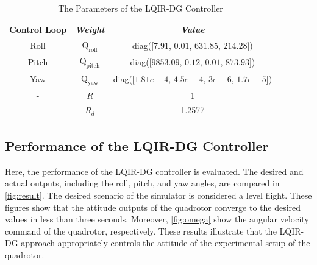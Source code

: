\documentclass[conference]{IEEEtran}
\begin{document}
\begin{table}[!h]
	\renewcommand{\arraystretch}{1.3}
	\caption{The Parameters of the LQIR-DG Controller}
	\begin{center}
	\begin{tabular}{c c c}
	\hline
	\textbf{Control Loop} & \textbf{\textit{Weight}}& \textbf{\textit{Value}} \\
	\hline
	Roll & 
	$\boldsymbol{{\mathrm{Q_{\text{roll}}}}}$ & diag([$7.91$, $0.01$, $631.85$, $214.28$])\\
	Pitch & 
	$\boldsymbol{{\mathrm{Q_{\text{pitch}}}}}$ & diag([$9853.09$, $0.12$, $0.01$, $873.93$])\\
	Yaw & 
	$\boldsymbol{{\mathrm{Q_{\text{yaw}}}}}$ & diag([$1.81e\!-\!4$, $4.5e\!-\!4$, $3e\!-\!6$, $1.7e\!-\!5$])\\
	-& $R$ & 1\\
	-& $R_{d}$ & 1.2577\\
	\hline
	\end{tabular}
	\end{center}
	\label{tab:control weight_new}
\end{table}


\subsection{Performance of the LQIR-DG Controller}

\noindent Here,
the performance of the LQIR-DG controller is evaluated. The desired and actual outputs, including the roll, pitch, and yaw angles, are compared in \figurename{\ref{fig:result}}. The desired scenario of the simulator is considered a level flight. These figures show that the attitude outputs of the quadrotor converge to the desired values in less than three seconds. Moreover, \figurename{\ref{fig:omega}} show the angular velocity command of the quadrotor, 
respectively. These results illustrate that the LQIR-DG approach appropriately controls the attitude of the experimental setup of the quadrotor.
\end{document}
